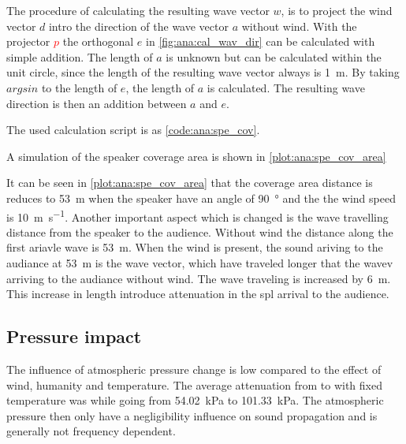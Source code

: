 The procedure of calculating the resulting wave vector $w$, is to project the wind vector $d$ intro the direction of the wave vector $a$ without wind. With the projector \textcolor{red}{$p$} the orthogonal $e$ in \autoref{fig:ana:cal_wav_dir} can be calculated with simple addition. The length of $a$ is unknown but can be calculated within the unit circle, since the length of the resulting wave vector always is \SI{1}{\meter}. By taking $argsin$ to the length of $e$, the length of $a$ is calculated. The resulting wave direction is then an addition between $a$ and $e$. 

The used calculation script is as \autoref{code:ana:spe_cov}.



A simulation of the speaker coverage area is shown in \autoref{plot:ana:spe_cov_area}



It can be seen in \autoref{plot:ana:spe_cov_area} that the coverage area distance is reduces to \SI{53}{\meter} when the speaker have an angle of \SI{90}{\degree} and the the wind speed is \SI{10}{\meter\per\second}. Another important aspect which is changed is the wave travelling distance from the speaker to the audience. Without wind the distance along the first ariavle wave is  \SI{53}{\meter}. When the wind is present, the sound ariving to the audiance at \SI{53}{\meter} is the wave vector, which have traveled longer that the wavev arriving to the audiance without wind. The wave traveling is increased by \SI{6}{\meter}. This increase in length introduce attenuation in the \gls{spl} arrival to the audience.


\subsection{Pressure impact}
The influence of atmospheric pressure change is low compared to the effect of wind, humanity and temperature. The average attenuation from  to  with fixed temperature was  while going from \SI{54.02}{\kilo\pascal} to \SI{101.33}{\kilo\pascal}. The atmospheric pressure then only have a negligibility influence on sound propagation and is generally not frequency dependent. 
 
